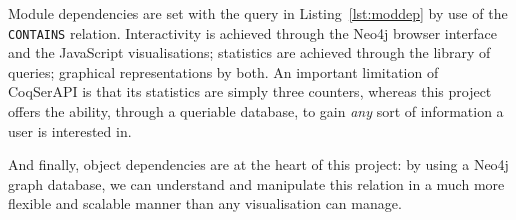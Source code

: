 Module dependencies are set with the query in Listing~\ref{lst:moddep} by use of
the \texttt{CONTAINS} relation.  Interactivity is achieved through the Neo4j
browser interface and the JavaScript visualisations; statistics are achieved
through the library of queries; graphical representations by both. An important
limitation of CoqSerAPI is that its statistics are simply three counters,
whereas this project offers the ability, through a queriable database, to gain
\emph{any} sort of information a user is interested in.

And finally, object dependencies are at the heart of this project: by using a
Neo4j graph database, we can understand and manipulate this relation in a much
more flexible and scalable manner than any visualisation can manage.
